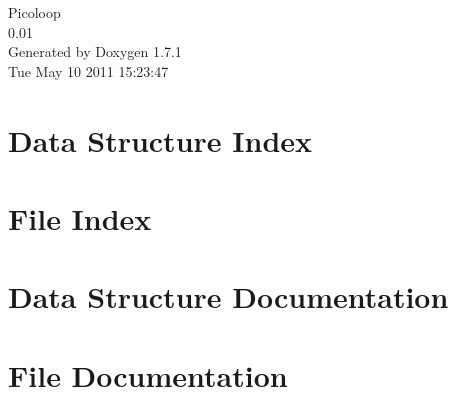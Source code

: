 \documentclass[a4paper]{book}
\begin{document}
\begin{titlepage}
\vspace*{7cm}
\begin{center}
{\Large Picoloop \\[1ex]\large 0.01 }\\
\vspace*{1cm}
{\large Generated by Doxygen 1.7.1}\\
\vspace*{0.5cm}
{\small Tue May 10 2011 15:23:47}\\
\end{center}
\end{titlepage}
\clearemptydoublepage
{}
\tableofcontents
\clearemptydoublepage
{}
\chapter{Data Structure Index}

\chapter{File Index}

\chapter{Data Structure Documentation}



\chapter{File Documentation}




\printindex
\end{document}
